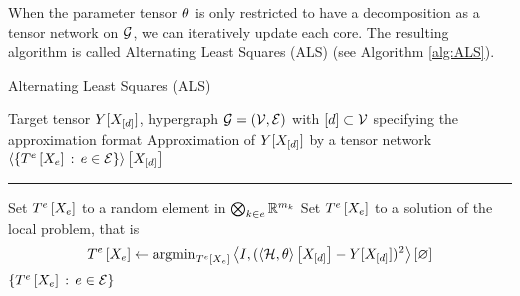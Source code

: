 




When the parameter tensor $\theta$ is only restricted to have a decomposition as a tensor network on $\mathcal{G}$, we can iteratively update each core.
The resulting algorithm is called Alternating Least Squares (ALS) (see Algorithm \ref{alg:ALS}).

\begin{algorithm}[hbt!]
\caption{Alternating Least Squares (ALS)}\label{alg:ALS}
\begin{algorithmic}
	\Require Target tensor $Y[X_{[d]}]$, hypergraph $\mathcal{G}=(\mathcal{V},\mathcal{E})$ with $[d]\subset\mathcal{V}$ specifying the approximation format
	\Ensure Approximation of $Y[X_{[d]}]$ by a tensor network $\left\langle \{T^{e}\left[X_{e}\right]\,:\,e\in\mathcal{E}\}\right\rangle \left[ X_{[d]} \right]$
	\hrule
\For{$\edgein$}
	\State Set $T^{e}\left[X_{e}\right]$ to a random element in $\bigotimes_{k\in e}\mathbb{R}^{m_{k}}$
\EndFor
{}
\For{$\edgein$}
	\State Set $T^{e}\left[X_{e}\right]$ to a solution of the local problem, that is
	\[ 
	T^{e}\left[X_{e}\right]
	 \leftarrow 
	 \mathrm{argmin}_{T^{e}\left[X_{e}\right]} 
	 \left\langle I, (\left\langle \mathcal{H},\theta\right\rangle \left[ X_{[d]} \right] - Y[X_{[d]}])^2\right\rangle \left[ \varnothing \right]
	 \]
\EndFor
\EndWhile
	\State \Return $\{T^{e}\left[X_{e}\right]\,:\,e\in\mathcal{E}\}$
\end{algorithmic}
\end{algorithm}



